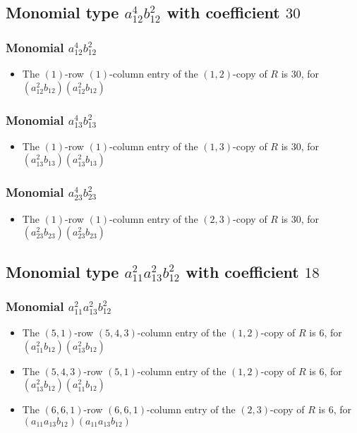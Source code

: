 \documentclass{article}
\begin{document}
\subsection{Monomial type $ a_{12}^{4} b_{12}^{2} $ with coefficient $ 30 $}

\subsubsection{Monomial $ a_{12}^{4} b_{12}^{2} $}

\begin{itemize}
\item The $(1)$-row $(1)$-column entry of the $ \left(1, 2\right) $-copy of $R$ is $ 30 $, for $( a_{12}^{2} b_{12} )( a_{12}^{2} b_{12} )$ 
\end{itemize}
\subsubsection{Monomial $ a_{13}^{4} b_{13}^{2} $}

\begin{itemize}
\item The $(1)$-row $(1)$-column entry of the $ \left(1, 3\right) $-copy of $R$ is $ 30 $, for $( a_{13}^{2} b_{13} )( a_{13}^{2} b_{13} )$ 
\end{itemize}
\subsubsection{Monomial $ a_{23}^{4} b_{23}^{2} $}

\begin{itemize}
\item The $(1)$-row $(1)$-column entry of the $ \left(2, 3\right) $-copy of $R$ is $ 30 $, for $( a_{23}^{2} b_{23} )( a_{23}^{2} b_{23} )$ 
\end{itemize}
\subsection{Monomial type $ a_{11}^{2} a_{13}^{2} b_{12}^{2} $ with coefficient $ 18 $}

\subsubsection{Monomial $ a_{11}^{2} a_{13}^{2} b_{12}^{2} $}

\begin{itemize}
\item The $(5, 1)$-row $(5, 4, 3)$-column entry of the $ \left(1, 2\right) $-copy of $R$ is $ 6 $, for $( a_{11}^{2} b_{12} )( a_{13}^{2} b_{12} )$ 
\item The $(5, 4, 3)$-row $(5, 1)$-column entry of the $ \left(1, 2\right) $-copy of $R$ is $ 6 $, for $( a_{13}^{2} b_{12} )( a_{11}^{2} b_{12} )$ 
\item The $(6, 6, 1)$-row $(6, 6, 1)$-column entry of the $ \left(2, 3\right) $-copy of $R$ is $ 6 $, for $( a_{11} a_{13} b_{12} )( a_{11} a_{13} b_{12} )$ 
\end{itemize}
\end{document}
